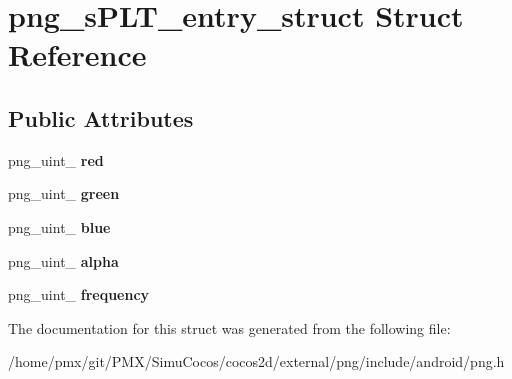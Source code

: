 \hypertarget{structpng__sPLT__entry__struct}{}\section{png\+\_\+s\+P\+L\+T\+\_\+entry\+\_\+struct Struct Reference}
\label{structpng__sPLT__entry__struct}
\subsection*{Public Attributes}
\begin{DoxyCompactItemize}
\item 
\mbox{\label{structpng__sPLT__entry__struct_a05ba3cef8aa2c43d1f52c0300c525fd9}} 
png\+\_\+uint\+\_ {\bfseries red}
\item 
\mbox{\label{structpng__sPLT__entry__struct_a3b4269fb63b4087bd618a6741b805554}} 
png\+\_\+uint\+\_ {\bfseries green}
\item 
\mbox{\label{structpng__sPLT__entry__struct_a2af6281d3b400362886a43977ebcb7db}} 
png\+\_\+uint\+\_ {\bfseries blue}
\item 
\mbox{\label{structpng__sPLT__entry__struct_abea98962a064e2a05f460b9f2ea2f47b}} 
png\+\_\+uint\+\_ {\bfseries alpha}
\item 
\mbox{\label{structpng__sPLT__entry__struct_ad8095a15bb5a054c12ef911478c5f3a3}} 
png\+\_\+uint\+\_ {\bfseries frequency}
\end{DoxyCompactItemize}


The documentation for this struct was generated from the following file\+:\begin{DoxyCompactItemize}
\item 
/home/pmx/git/\+P\+M\+X/\+Simu\+Cocos/cocos2d/external/png/include/android/png.\+h\end{DoxyCompactItemize}
